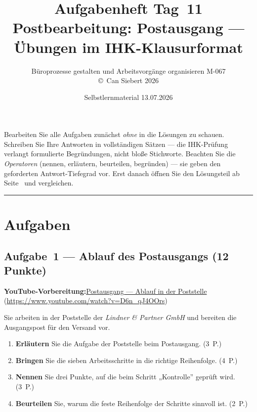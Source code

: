 \documentclass[11pt, a4paper]{article}
\title{\vspace*{-1.5cm}\Huge\bfseries\color{bfwPrimaryDark}Aufgabenheft Tag~11\\[0.4em]
  \large\color{bfwInkSoft}\textnormal{Postbearbeitung: Postausgang --- Übungen im IHK-Klausurformat}}
\author{\textsf{Büroprozesse gestalten und Arbeitsvorgänge organisieren \textperiodcentered{} M-067}\\
\textsf{\small\copyright\ Can Siebert\,\textperiodcentered\,2026}}
\date{Selbstlernmaterial \textperiodcentered{} 13.07.2026}
\begin{document}
\maketitle
\thispagestyle{empty}

\begin{merksatz}[title={\bfseries So nutzen Sie dieses Aufgabenheft}]
Bearbeiten Sie alle Aufgaben zunächst \emph{ohne} in die Lösungen zu schauen. Schreiben
Sie Ihre Antworten in vollständigen Sätzen --- die IHK-Prüfung verlangt formulierte
Begründungen, nicht bloße Stichworte. Beachten Sie die \emph{Operatoren} (nennen,
erläutern, beurteilen, begründen) --- sie geben den geforderten Antwort-Tiefegrad vor.
Erst danach öffnen Sie den Lösungsteil ab Seite~\pageref{loesungen} und vergleichen.
\end{merksatz}

\tableofcontents
\vspace{1em}
\hrule

\section{Aufgaben}

\subsection*{Aufgabe~1 --- Ablauf des Postausgangs (12 Punkte)}

\noindent\textbf{\color{bfwAccent}YouTube-Vorbereitung:}\enspace \href{https://www.youtube.com/watch?v=D6n_qJ4OOrs}{Postausgang --- Ablauf in der Poststelle} (\url{https://www.youtube.com/watch?v=D6n_qJ4OOrs})

\medskip
Sie arbeiten in der Poststelle der \emph{Lindner \& Partner GmbH} und bereiten die
Ausgangspost für den Versand vor.

\begin{enumerate}[label=(\alph*)]
  \item \textbf{Erläutern} Sie die Aufgabe der Poststelle beim Postausgang. \hfill (3~P.)
  \item \textbf{Bringen} Sie die sieben Arbeitsschritte in die richtige Reihenfolge. \hfill (4~P.)
  \item \textbf{Nennen} Sie drei Punkte, auf die beim Schritt „Kontrolle” geprüft wird. \hfill (3~P.)
  \item \textbf{Beurteilen} Sie, warum die feste Reihenfolge der Schritte sinnvoll ist. \hfill (2~P.)
\end{enumerate}
\end{document}
